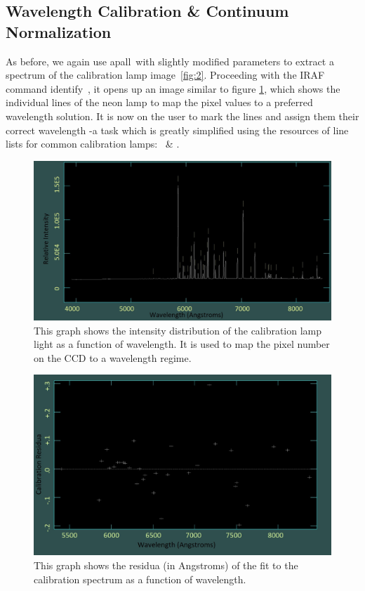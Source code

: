 \documentclass{article}
\begin{document}
\subsection{Wavelength Calibration \& Continuum Normalization}
\label{ss:3}
As before, we again use \glqq apall\grqq ~with slightly modified parameters to extract a spectrum of the calibration lamp image~\ref{fig:2}. Proceeding with the IRAF command \glqq identify\grqq~, it opens up an image similar to figure \ref{fig:7}, which shows the individual lines of the neon lamp to map the pixel values to a preferred wavelength solution. It is now on the user to mark the lines and assign them their correct wavelength {-}a task which is greatly simplified using the resources of line lists for common calibration lamps:~\parencite{Line_Identity_1} \& \parencite{Line_Identity_2}.
\begin{figure}[H]
  	\centering
    \includegraphics[width=1.00\textwidth]{spectroscopy/calibration_done.jpg}
 	\caption{This graph shows the intensity distribution of the calibration lamp light as a function of wavelength. It is used to map the pixel number on the CCD to a wavelength regime.}
 	\label{fig:7}
\end{figure}
\begin{figure}[H]
	\centering
	\includegraphics[width=1.00\textwidth]{spectroscopy/residua_calib.jpg}
  	\caption{This graph shows the residua (in Angstroms) of the fit to the calibration spectrum as a function of wavelength.}
  	\label{fig:8}
\end{figure}
\end{document}
